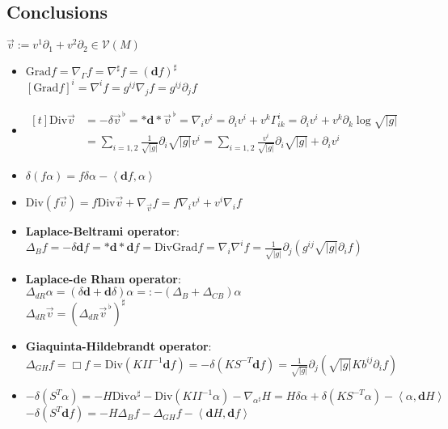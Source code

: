 \documentclass{scrartcl}
\newcommand{\exd}{\mathbf{d}}
\newcommand{\Div}{\text{Div}}
\newcommand{\vecflat}[1]{\vec{#1}^{\,\flat}}
\begin{document}
    \subsection{Conclusions}
    \(  \vec{v} := v^{1}\partial_{1} + v^{2}\partial_{2}\in\mathcal{V}(M) \)
    \begin{itemize}
      \item \( \text{Grad}f = \nabla_{\Gamma}f = \nabla^{\sharp}f = \left( \exd f \right)^{\sharp} \)\\
            \( \left[  \text{Grad}f \right]^{i} = \nabla^{i}f =g^{ij}\nabla_{j} f = g^{ij}\partial_{j}f \)
      \item \(
        \begin{aligned}[t]
            \text{Div}\vec{v} &= -\delta\vecflat{v} = *\exd * \vecflat{v} = \nabla_{i}v^{i}
                               = \partial_{i}v^{i} + v^{k}\Gamma_{ik}^{i} 
                               = \partial_{i}v^{i} + v^{k}\partial_{k}\log\sqrt{|g|}\\
                                 &= \sum_{i=1,2} \frac{1}{\sqrt{|g|}}\partial_{i} \sqrt{|g|} v^{i}
                                 = \sum_{i=1,2} \frac{v^{i}}{\sqrt{|g|}}\partial_{i} \sqrt{|g|} + \partial_{i}v^{i}
        \end{aligned}\)\\
      \item
        \( \delta\left( f\alpha \right) = f\delta\alpha - \left\langle \exd f , \alpha \right\rangle \)
      \item
        \( \text{Div} (f\vec{v}) = f\text{Div}\vec{v} + \nabla_{\vec{v}}f = f\nabla_{i}v^{i} + v^{i}\nabla_{i}f  \)
      \item \textbf{Laplace-Beltrami operator}:\\
        \( \Delta_{B}f = -\delta\exd f = *\exd *\exd f = \text{Div}\text{Grad}f = \nabla_{i}\nabla^{i} f
                      = \frac{1}{\sqrt{|g|}}\partial_{j}\left( g^{ij}\sqrt{|g|}\partial_{i}f \right) \)
      \item \textbf{Laplace-de Rham operator}:\\
        \( \Delta_{dR}\alpha = \left( \delta\exd + \exd\delta \right)\alpha =:  -\left( \Delta_{B} + \Delta_{CB} \right)\alpha \)\\
        \( \Delta_{dR}\vec{v} = \left( \Delta_{dR}\vecflat{v} \right)^{\sharp} \)
      \item \textbf{Giaquinta-Hildebrandt operator}:\\
        \( \Delta_{GH}f = \Box f = \text{Div}\left( K II^{-1} \exd f \right)
                                = -\delta\left( KS^{-T}\exd f \right)
                                = \frac{1}{\sqrt{|g|}}\partial_{j}\left( \sqrt{|g|}K b^{ij}\partial_{i}f \right)\)
      \item 
        \( -\delta\left( S^{T}\alpha \right) = -H\Div \alpha^{\sharp} - \Div\left(  K II^{-1} \alpha \right) - \nabla_{\alpha^{\sharp}}H
                            = H\delta\alpha + \delta\left( KS^{-T}\alpha \right) - \left\langle \alpha , \exd H \right\rangle\) 
        \( -\delta\left( S^{T}\exd f \right) = -H\Delta_{B}f - \Delta_{GH}f - \left\langle \exd H , \exd f \right\rangle \)
    \end{itemize}
\end{document}
